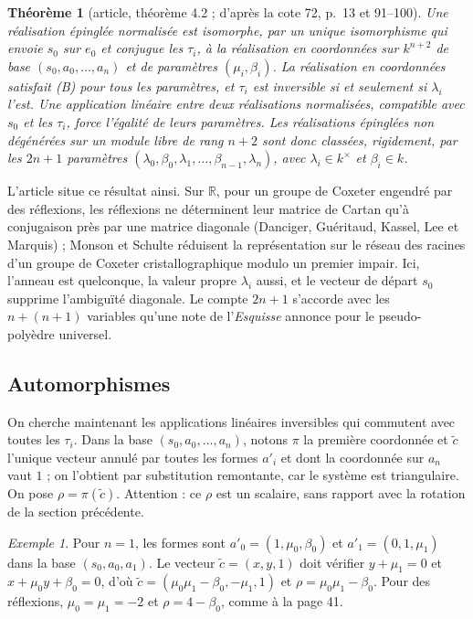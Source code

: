 \documentclass[11pt,a4paper]{amsart}
\theoremstyle{definition}
\theoremstyle{plain}
\newtheorem{theoreme}{Théorème}
\theoremstyle{remark}
\newtheorem{exemple}{Exemple}
\newcommand{\R}{\mathbb R}
\begin{document}
\begin{theoreme}[article, théorème 4.2 ; d'après la cote 72, p.~13 et 91--100]
Une réalisation épinglée normalisée est isomorphe, par un unique isomorphisme qui envoie $s_0$ sur $e_0$ et conjugue les $\tau_i$, à la réalisation en coordonnées sur $k^{n+2}$ de base $(s_0, a_0, \dots, a_n)$ et de paramètres $(\mu_i, \beta_i)$. La réalisation en coordonnées satisfait (B) pour tous les paramètres, et $\tau_i$ est inversible si et seulement si $\lambda_i$ l'est. Une application linéaire entre deux réalisations normalisées, compatible avec $s_0$ et les $\tau_i$, force l'égalité de leurs paramètres. Les réalisations épinglées non dégénérées sur un module libre de rang $n+2$ sont donc classées, rigidement, par les $2n+1$ paramètres $(\lambda_0, \beta_0, \lambda_1, \dots, \beta_{n-1}, \lambda_n)$, avec $\lambda_i \in k^\times$ et $\beta_i \in k$.
\end{theoreme}

L'article situe ce résultat ainsi. Sur $\R$, pour un groupe de Coxeter engendré par des réflexions, les réflexions ne déterminent leur matrice de Cartan qu'à conjugaison près par une matrice diagonale (Danciger, Guéritaud, Kassel, Lee et Marquis) ; Monson et Schulte réduisent la représentation sur le réseau des racines d'un groupe de Coxeter cristallographique modulo un premier impair. Ici, l'anneau est quelconque, la valeur propre $\lambda_i$ aussi, et le vecteur de départ $s_0$ supprime l'ambiguïté diagonale. Le compte $2n+1$ s'accorde avec les $n + (n+1)$ variables qu'une note de l'\emph{Esquisse} annonce pour le pseudo-polyèdre universel.

\subsection{Automorphismes}

On cherche maintenant les applications linéaires inversibles qui commutent avec toutes les $\tau_i$. Dans la base $(s_0, a_0, \dots, a_n)$, notons $\pi$ la première coordonnée et $\tilde c$ l'unique vecteur annulé par toutes les formes $a'_i$ et dont la coordonnée sur $a_n$ vaut $1$ ; on l'obtient par substitution remontante, car le système est triangulaire. On pose $\rho = \pi(\tilde c)$. Attention : ce $\rho$ est un scalaire, sans rapport avec la rotation de la section précédente.

\begin{exemple}
Pour $n = 1$, les formes sont $a'_0 = (1, \mu_0, \beta_0)$ et $a'_1 = (0, 1, \mu_1)$ dans la base $(s_0, a_0, a_1)$. Le vecteur $\tilde c = (x, y, 1)$ doit vérifier $y + \mu_1 = 0$ et $x + \mu_0y + \beta_0 = 0$, d'où $\tilde c = (\mu_0\mu_1 - \beta_0, -\mu_1, 1)$ et $\rho = \mu_0\mu_1 - \beta_0$. Pour des réflexions, $\mu_0 = \mu_1 = -2$ et $\rho = 4 - \beta_0$, comme à la page 41.
\end{exemple}
\end{document}
